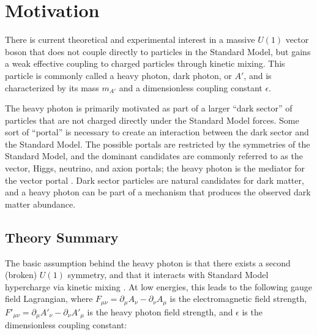\chapter{Motivation}
There is current theoretical and experimental interest in a massive $U(1)$ vector boson that does not couple directly to particles in the Standard Model, but gains a weak effective coupling to charged particles through kinetic mixing.
This particle is commonly called a heavy photon, dark photon, or $A'$, and is characterized by its mass $m_{A'}$ and a dimensionless coupling constant $\epsilon$.

The heavy photon is primarily motivated as part of a larger ``dark sector'' of particles that are not charged directly under the Standard Model forces.
Some sort of ``portal'' is necessary to create an interaction between the dark sector and the Standard Model.
The possible portals are restricted by the symmetries of the Standard Model, and the dominant candidates are commonly referred to as the vector, Higgs, neutrino, and axion portals; the heavy photon is the mediator for the vector portal \cite{essig_dark_2013}.
Dark sector particles are natural candidates for dark matter, and a heavy photon can be part of a mechanism that produces the observed dark matter abundance.

%

\section{Theory Summary}
The basic assumption behind the heavy photon is that there exists a second (broken) $U(1)$ symmetry, and that it interacts with Standard Model hypercharge via kinetic mixing \cite{holdom_two_1986}.
At low energies, this leads to the following gauge field Lagrangian, where $F_{\mu\nu}=\partial_\mu A_\nu - \partial_\nu A_\mu$ is the electromagnetic field strength, $F'_{\mu\nu} = \partial_\mu A'_\nu - \partial_\nu A'_\mu$ is the heavy photon field strength, and $\epsilon$ is the dimensionless coupling constant:

